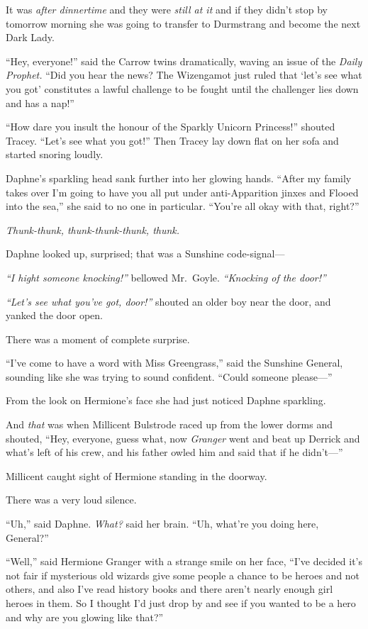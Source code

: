 It was \emph{after dinnertime} and they were \emph{still at it} and if
they didn't stop by tomorrow morning she was going to transfer to
Durmstrang and become the next Dark Lady.

``Hey, everyone!'' said the Carrow twins dramatically, waving an issue
of the \emph{Daily Prophet.} ``Did you hear the news? The Wizengamot
just ruled that `let's see what you got' constitutes a lawful challenge
to be fought until the challenger lies down and has a nap!''

``How dare you insult the honour of the Sparkly Unicorn Princess!''
shouted Tracey. ``Let's see what you got!'' Then Tracey lay down flat on
her sofa and started snoring loudly.

Daphne's sparkling head sank further into her glowing hands. ``After my
family takes over I'm going to have you all put under anti-Apparition
jinxes and Flooed into the sea,'' she said to no one in particular.
``You're all okay with that, right?''

\emph{Thunk-thunk, thunk-thunk-thunk, thunk.}

Daphne looked up, surprised; that was a Sunshine code-signal---

\emph{``I hight someone knocking!''} bellowed Mr.~Goyle.
\emph{``Knocking of the door!''}

\emph{``Let's see what you've got, door!''} shouted an older boy near
the door, and yanked the door open.

There was a moment of complete surprise.

``I've come to have a word with Miss Greengrass,'' said the Sunshine
General, sounding like she was trying to sound confident. ``Could
someone please---''

From the look on Hermione's face she had just noticed Daphne sparkling.

And \emph{that} was when Millicent Bulstrode raced up from the lower
dorms and shouted, ``Hey, everyone, guess what, now \emph{Granger} went
and beat up Derrick and what's left of his crew, and his father owled
him and said that if he didn't---''

Millicent caught sight of Hermione standing in the doorway.

There was a very loud silence.

``Uh,'' said Daphne. \emph{What?} said her brain. ``Uh, what're you
doing here, General?''

``Well,'' said Hermione Granger with a strange smile on her face, ``I've
decided it's not fair if mysterious old wizards give some people a
chance to be heroes and not others, and also I've read history books and
there aren't nearly enough girl heroes in them. So I thought I'd just
drop by and see if you wanted to be a hero and why are you glowing like
that?''

